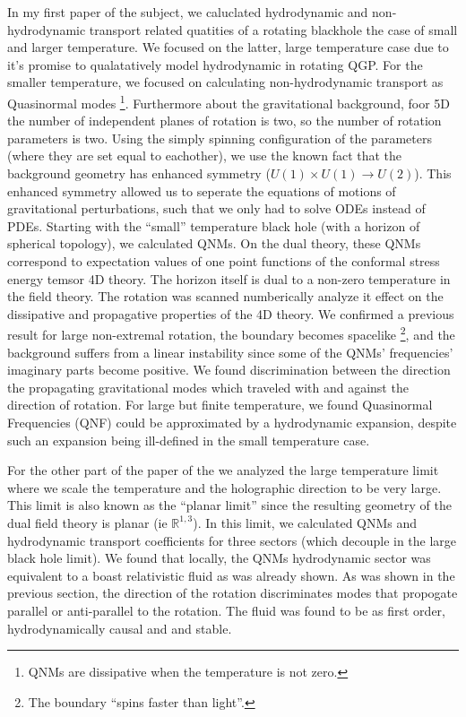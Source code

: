 \documentclass[12pt]{article}
\begin{document}
In my first paper of the subject, we caluclated hydrodynamic and non-hydrodynamic transport related quatities of a rotating blackhole the case of small and larger temperature.
We focused on the latter, large temperature case due to it's promise to qualatatively model hydrodynamic in rotating QGP.
For the smaller temperature, we focused on calculating non-hydrodynamic transport as Quasinormal modes
  \footnote{QNMs are dissipative when the temperature is not zero.}.
Furthermore about the gravitational background, foor 5D the number of independent planes of rotation is two, so the number of rotation parameters is two.
Using the simply spinning configuration of the parameters (where they are set equal to eachother), we use the known fact that the background geometry has enhanced symmetry ($U(1)\times U(1) \rightarrow U(2)$).
This enhanced symmetry allowed us to seperate the equations of motions of gravitational perturbations, such that we only had to solve ODEs instead of PDEs.
Starting with the ``small'' temperature black hole (with a horizon of spherical topology), we calculated QNMs.
On the dual theory, these QNMs correspond to expectation values of one point functions of the conformal stress energy temsor 4D theory.
The horizon itself is dual to a non-zero temperature in the field theory.
The rotation was scanned numberically analyze it effect on the dissipative and propagative properties of the 4D theory.
We confirmed a previous result for large non-extremal rotation, the boundary becomes spacelike
  \footnote{The boundary ``spins faster than light''.}, 
and the background suffers from a linear instability since some of the QNMs' frequencies' imaginary parts become positive.
We found discrimination between the direction the propagating gravitational modes which traveled with and against the direction of rotation.
For large but finite temperature, we found Quasinormal Frequencies (QNF) could be approximated by a hydrodynamic expansion, despite such an expansion being ill-defined in the small temperature case.

For the other part of the paper of the we analyzed the large temperature limit where we scale the temperature and the holographic direction to be very large.
This limit is also known as the ``planar limit'' since the resulting geometry of the dual field theory is planar (ie $\mathds{R}^{1,3}$). 
In this limit, we calculated QNMs and hydrodynamic transport coefficients for three sectors (which decouple in the large black hole limit).
We found that locally, the QNMs hydrodynamic sector was equivalent to a boast relativistic fluid as was already shown.
As was shown in the previous section, the direction of the rotation discriminates modes that propogate parallel or anti-parallel to the rotation.
The fluid was found to be as first order, hydrodynamically causal and and stable.
\end{document}
